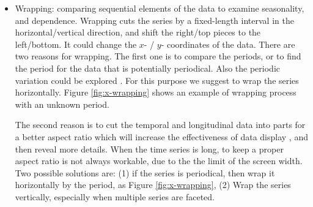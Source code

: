 \documentclass[12pt]{article}
\begin{document}
\begin{itemize} \itemsep 0in

\item Wrapping: comparing sequential elements of the
data to examine seasonality, and dependence.
Wrapping cuts the series by a fixed-length interval in
the horizontal/vertical direction, and shift the right/top pieces
to the left/bottom. It could change the $x$- / $y$- coordinates of the
data.
There are two reasons for wrapping. The first one
is to compare the periods, or to find the period for the data
that is potentially periodical. Also the periodic variation
could be explored \citep{mcdonald1986periodic}. For this
purpose we suggest to wrap the series horizontally.
Figure \ref{fig:x-wrapping}
shows an example of wrapping process with an unknown period.

The second reason is to cut the temporal and longitudinal data into
parts for a better aspect ratio which will increase the effectiveness
of data display \citep{cleveland1987graphical}, and then reveal more
details. When the time series is long, to keep a proper aspect ratio
is not always workable, due to the the limit of the screen width.
Two possible solutions are:  (1) if the series is periodical, then wrap
it horizontally by the period, as Figure %
\ref{fig:x-wrapping},  (2) Wrap the series vertically, especially
when multiple series are faceted.



\end{itemize}
\end{document}
